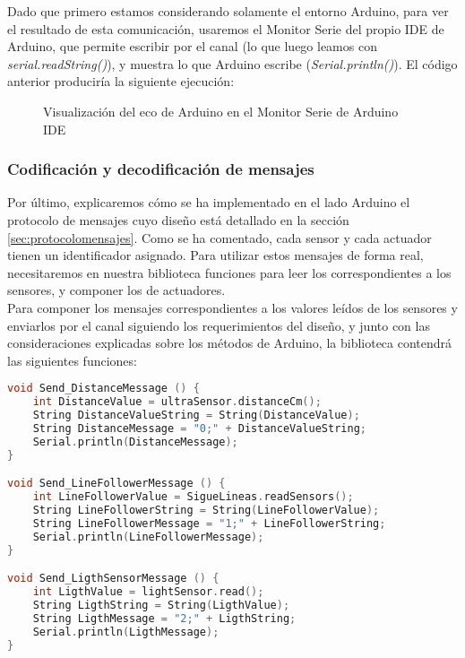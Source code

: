 Dado que primero estamos considerando solamente el entorno Arduino, para ver el resultado de esta comunicación, usaremos el Monitor Serie del propio IDE de Arduino, que permite escribir por el canal (lo que luego leamos con \textit{serial.readString()}), y muestra lo que Arduino escribe (\textit{Serial.println()}). El código anterior produciría la siguiente ejecución:
\begin{figure}[h]
	\centering	
	\begin{subfigure}
		[Escribir el String que Arduino lee del canal]{
			\texttt{[image: MonitorEnviar.png]}
			\label{img:ComunicacionArduinoEnviar}}
	\end{subfigure}
	\begin{subfigure}
		[Muestra el String que Arduino ha escrito en el canal]{
			\texttt{[image: MonitorRespuesta.png]}
			\label{img:ComunicacionArduinoLeer}}
	\end{subfigure}
	\label{img:ComunicacionArduinoMonitorSerie}
	\caption{Visualización del eco de Arduino en el Monitor Serie de Arduino IDE}
\end{figure}


\subsubsection{Codificación y decodificación de mensajes}\label{subsubsec:mensajesArduino}

Por último, explicaremos cómo se ha implementado en el lado Arduino el protocolo de mensajes cuyo diseño está detallado en la sección  \ref{sec:protocolomensajes}. Como se ha comentado, cada sensor y cada actuador tienen un identificador asignado.
Para utilizar estos mensajes de forma real, necesitaremos en nuestra biblioteca funciones para leer los correspondientes a los sensores, y  componer los de actuadores. \\

Para componer los mensajes correspondientes a los valores leídos de los sensores y enviarlos por el canal siguiendo los requerimientos del diseño, y junto con las consideraciones explicadas sobre los métodos de Arduino, la biblioteca contendrá las siguientes funciones:
 
\begin{lstlisting}[language=C,caption={Envío de mensajes para los sensores}]
void Send_DistanceMessage () {
	int DistanceValue = ultraSensor.distanceCm();
	String DistanceValueString = String(DistanceValue);
	String DistanceMessage = "0;" + DistanceValueString; 
	Serial.println(DistanceMessage);
}

void Send_LineFollowerMessage () {
	int LineFollowerValue = SigueLineas.readSensors();
	String LineFollowerString = String(LineFollowerValue);
	String LineFollowerMessage = "1;" + LineFollowerString; 
	Serial.println(LineFollowerMessage);
}

void Send_LigthSensorMessage () {
	int LigthValue = lightSensor.read();
	String LigthString = String(LigthValue);
	String LigthMessage = "2;" + LigthString; 
	Serial.println(LigthMessage);
}
\end{lstlisting}

